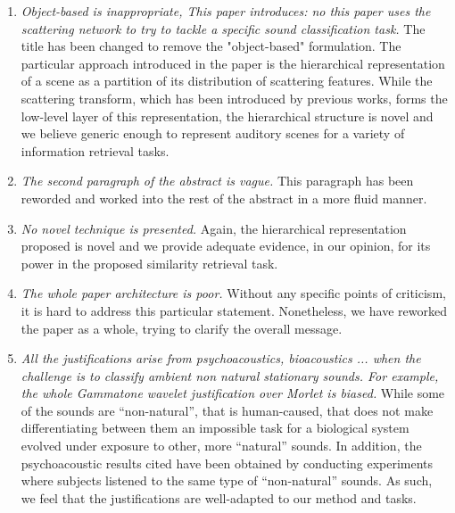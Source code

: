 \documentclass[10pt]{article}
\begin{document}
\begin{enumerate}

\item \emph{Object-based is inappropriate, This paper introduces: no this paper uses the scattering network to try to tackle a specific sound classification task.}
The title has been changed to remove the "object-based" formulation. The particular approach introduced in the paper is the hierarchical representation of a scene as a partition of its distribution of scattering features. While the scattering transform, which has been introduced by previous works, forms the low-level layer of this representation, the hierarchical structure is novel and we believe generic enough to represent auditory scenes for a variety of information retrieval tasks.

\item \emph{The second paragraph of the abstract is vague.}
This paragraph has been reworded and worked into the rest of the abstract in a more fluid manner.

\item \emph{No novel technique is presented.}
Again, the hierarchical representation proposed is novel and we provide adequate evidence, in our opinion, for its power in the proposed similarity retrieval task.

\item \emph{The whole paper architecture is poor.}
Without any specific points of criticism, it is hard to address this particular statement. Nonetheless, we have reworked the paper as a whole, trying to clarify the overall message.

\item \emph{All the justifications arise from psychoacoustics, bioacoustics ... when the challenge is to classify ambient non natural stationary sounds. For example, the whole Gammatone wavelet justification over Morlet is biased.}
While some of the sounds are ``non-natural'', that is human-caused, that does not make differentiating between them an impossible task for a biological system evolved under exposure to other, more ``natural'' sounds. In addition, the psychoacoustic results cited have been obtained by conducting experiments where subjects listened to the same type of ``non-natural'' sounds. As such, we feel that the justifications are well-adapted to our method and tasks.


\end{enumerate}
\end{document}
